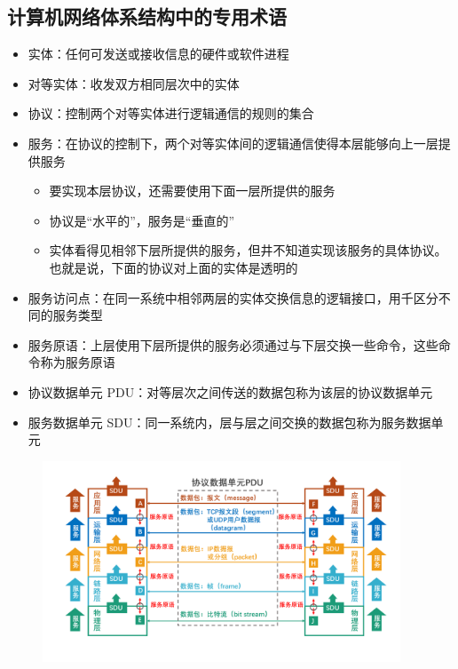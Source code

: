 \documentclass[cs4size,a4paper,10pt]{ctexart}
\begin{document}
	\subsection{计算机网络体系结构中的专用术语}
	\begin{itemize}
		\item 实体：任何可发送或接收信息的硬件或软件进程
		\item 对等实体：收发双方相同层次中的实体
		\item 协议：控制两个对等实体进行逻辑通信的规则的集合
		\item 服务：在协议的控制下，两个对等实体间的逻辑通信使得本层能够向上一层提供服务
		\begin{itemize}
			\item 要实现本层协议，还需要使用下面一层所提供的服务
			\item 协议是“水平的”，服务是“垂直的”
			\item 实体看得见相邻下层所提供的服务，但井不知道实现该服务的具体协议。也就是说，下面的协议对上面的实体是透明的
		\end{itemize}
		\item 服务访问点：在同一系统中相邻两层的实体交换信息的逻辑接口，用千区分不同的服务类型
		\item 服务原语：上层使用下层所提供的服务必须通过与下层交换一些命令，这些命令称为服务原语
		\item 协议数据单元 PDU：对等层次之间传送的数据包称为该层的协议数据单元
		\item 服务数据单元 SDU：同一系统内，层与层之间交换的数据包称为服务数据单元
	\end{itemize}

	\begin{figure}[H]
		\centering
		\includegraphics[width=0.95\textwidth]{img/1.6.4}
	\end{figure}

	
\end{document}
